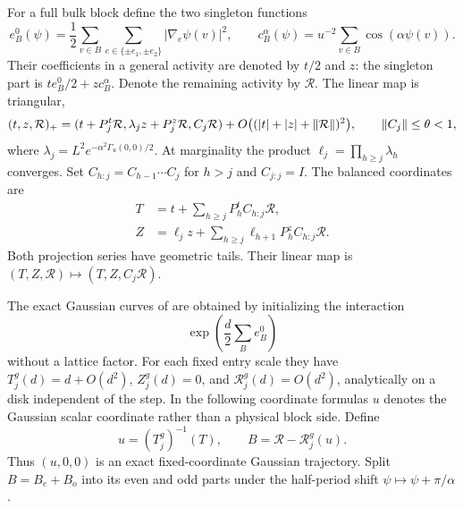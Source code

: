 For a full bulk block define the two singleton functions
\[
 e_B^0(\psi)=\frac12\sum_{v\in B}
              \sum_{e\in\{\pm e_1,\pm e_2\}}|\nabla_e\psi(v)|^2,
 \qquad c_B^\alpha(\psi)=u^{-2}\sum_{v\in B}\cos(\alpha\psi(v)).
\]
Their coefficients in a general activity are denoted by \(t/2\)
and \(z\): the singleton part is \(t e_B^0/2+zc_B^\alpha\).
Denote the remaining activity by \(\mathcal R\).  The linear map is
triangular,
\[
 (t,z,\mathcal R)_+
   =(t+P_j^t\mathcal R,\lambda_jz+P_j^z\mathcal R,C_j\mathcal R)
       +O\bigl((|t|+|z|+\lVert\mathcal R\rVert)^2\bigr),
 \qquad \lVert C_j\rVert\le\theta<1,
\]
where \(\lambda_j=L^2e^{-\alpha^2\Gamma_u(0,0)/2}\).
At marginality the product \(\ell_j=\prod_{h\ge j}\lambda_h\)
converges.  Set \(C_{h:j}=C_{h-1}\cdots C_j\) for \(h>j\)
and \(C_{j:j}=I\).  The balanced coordinates are
\begin{align}\label{inp:balance}
 T&=t+\sum_{h\ge j}P_h^tC_{h:j}\mathcal R,\nonumber\\
 Z&=\ell_jz+\sum_{h\ge j}\ell_{h+1}P_h^zC_{h:j}\mathcal R.
\end{align}
Both projection series have geometric tails.  Their linear map is
\((T,Z,\mathcal R)\mapsto(T,Z,C_j\mathcal R)\).

The exact Gaussian curves of
\cite[Lemma 10.3]{B}
are obtained by initializing the interaction
\[
                         \exp\left(\frac d2\sum_Be_B^0\right)
\]
without a lattice factor.  For each fixed entry scale they have
\(T_j^g(d)=d+O(d^2)\), \(Z_j^g(d)=0\), and
\(\mathcal R_j^g(d)=O(d^2)\), analytically on a disk independent
of the step.  In the following coordinate formulas \(u\) denotes
the Gaussian scalar coordinate rather than a physical block side.
Define
\[
 u=(T_j^g)^{-1}(T),\qquad
 B=\mathcal R-\mathcal R_j^g(u).
\]
Thus \((u,0,0)\) is an exact fixed-coordinate Gaussian trajectory.
Split \(B=B_e+B_o\) into its even and odd parts under the
half-period shift \(\psi\mapsto\psi+\pi/\alpha\).


